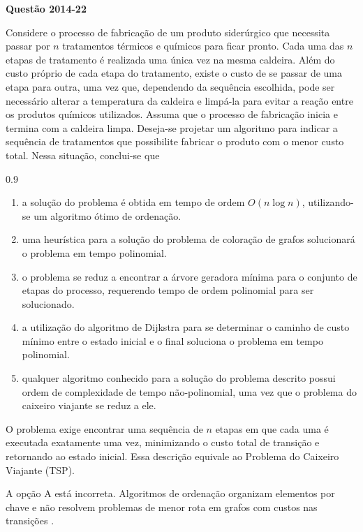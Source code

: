 \documentclass[12pt,a4paper]{article}
\newenvironment{question}[1]{%
    \pdfbookmark[3]{Questão #1}{q:#1}
    \label{q:#1}
    \bigskip\par\noindent
    \textbf{Questão #1} \dotfill
    \medskip\par\nopagebreak\noindent
    \ignorespaces
}{%
    \noindent\dotfill\medskip
}
\begin{document}
\begin{question}{2014-22}
Considere o processo de fabricação de um produto siderúrgico que necessita passar por $n$ tratamentos térmicos e químicos para ficar pronto.
Cada uma das $n$ etapas de tratamento é realizada uma única vez na mesma caldeira.
Além do custo próprio de cada etapa do tratamento, existe o custo de se passar de uma etapa para outra, uma vez que, dependendo da sequência escolhida,
pode ser necessário alterar a temperatura da caldeira e limpá-la para evitar a reação entre os produtos químicos utilizados.
Assuma que o processo de fabricação inicia e termina com a caldeira limpa.
Deseja-se projetar um algoritmo para indicar a sequência de tratamentos que possibilite fabricar o produto com o menor custo total.
Nessa situação, conclui-se que

\begin{spacing}{0.9}
\begin{small}
\begin{enumerate}[label=\Alph*)]
    \item a solução do problema é obtida em tempo de ordem $O(n \log n)$, utilizando-se um algoritmo ótimo de ordenação.
    \item uma heurística para a solução do problema de coloração de grafos solucionará o problema em tempo polinomial.
    \item o problema se reduz a encontrar a árvore geradora mínima para o conjunto de etapas do processo,
    requerendo tempo de ordem polinomial para ser solucionado.
    \item a utilização do algoritmo de Dijkstra para se determinar o caminho de custo mínimo entre o estado inicial e o final soluciona o problema em tempo polinomial.
    \item qualquer algoritmo conhecido para a solução do problema descrito possui ordem de complexidade de tempo não-polinomial,
    uma vez que o problema do caixeiro viajante se reduz a ele.
\end{enumerate}
\end{small}
\end{spacing}
\end{question}

O problema exige encontrar uma sequência de $n$ etapas em que cada uma é executada exatamente uma vez,
minimizando o custo total de transição e retornando ao estado inicial. Essa descrição equivale ao Problema do Caixeiro Viajante (TSP).

A opção A está incorreta.
Algoritmos de ordenação organizam elementos por chave e não resolvem problemas de menor rota em grafos com custos nas transições \parencite[cap.~8]{clrs2022}.
\end{document}
